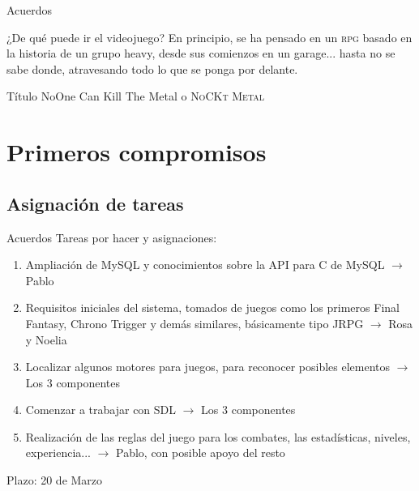 \documentclass[9pt,xcolor=svgnames]{beamer}
\begin{document}
  
  \begin{frame}{Acuerdos}
   \transdissolve
   
   \begin{block}{¿De qué puede ir el videojuego?}
    En principio, se ha pensado en un \textsc{rpg} basado en la historia
    de un grupo heavy, desde sus comienzos en un garage... hasta no se
    sabe donde, atravesando todo lo que se ponga por delante.\\[1cm]
   \end{block}

   \pause
   
   \begin{block}{Título}
    \Large{NoOne Can Kill The Metal o \textsc{NoCKt Metal}}
   \end{block}
   
  \end{frame}
   
   
 \section{Primeros compromisos}
 
  \subsection{Asignación de tareas}
  
  \begin{frame}{Acuerdos}
   \transdissolve
   Tareas por hacer y asignaciones:
   
   \begin{enumerate}
    \item Ampliación de MySQL y conocimientos sobre la API para C de
	  MySQL $\longrightarrow$ Pablo
    \item Requisitos iniciales del sistema, tomados de juegos como los
	  primeros Final Fantasy, Chrono Trigger y demás similares,
	  básicamente tipo JRPG $\longrightarrow$ Rosa y Noelia
    \item Localizar algunos motores para juegos, para reconocer posibles
	  elementos $\longrightarrow$ Los 3 componentes
    \item Comenzar a trabajar con SDL $\longrightarrow$ Los 3
	  componentes
    \item Realización de las reglas del juego para los combates, las
	  estadísticas, niveles, experiencia... $\longrightarrow$ Pablo,
	  con posible apoyo del resto
   \end{enumerate}
   Plazo: 20 de Marzo
  \end{frame}
\end{document}

